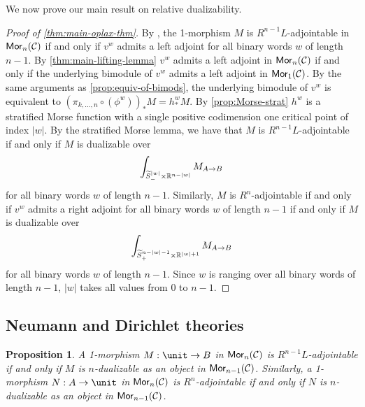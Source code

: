 \documentclass[10pt, reqno, twoside
, final
]{amsart}
\numberwithin{equation}{subsection}%
\theoremstyle{definition}
\theoremstyle{definition}
\theoremstyle{definition}
\theoremstyle{definition}
\theoremstyle{definition}
\theoremstyle{definition}
\theoremstyle{definition}
\theoremstyle{definition}
\theoremstyle{definition}
\theoremstyle{plain}
\theoremstyle{definition}
\theoremstyle{plain}
\theoremstyle{definition}
\theoremstyle{plain}
\theoremstyle{definition}
\theoremstyle{definition}
\theoremstyle{plain}
\theoremstyle{plain}
\theoremstyle{definition}
\theoremstyle{plain}
\theoremstyle{plain}
\newtheorem{prop}[defn]{Proposition}
\theoremstyle{plain}
\begin{document}
We now prove our main result on relative dualizability.

\begin{proof}[Proof of \cref{thm:main-oplax-thm}]
By \cite{JFS,SS25}, the 1-morphism $M$ is $R^{n-1}L$-adjointable in $\mathsf{Mor}_n(\mathcal{C})$ if and only if $v^w$ admits a left adjoint for all binary words $w$ of length $n-1$. By \cref{thm:main-lifting-lemma} $v^w$ admits a left adjoint in $\mathsf{Mor}_n(\mathcal{C})$ if and only if the underlying bimodule of $v^w$ admits a left adjoint in $\mathsf{Mor}_1(\mathcal{C})$. By the same arguments as \cref{prop:equiv-of-bimods}, the underlying bimodule of $v^w$ is equivalent to $(\pi_{k,...,n} \circ (\phi^w))_\ast M = h^{w}_{\ast} M$. By \cref{prop:Morse-strat} $h^w$ is a stratified Morse function with a single positive codimension one critical point of index $|w|$. By the stratified Morse lemma, we have that $M$ is $R^{n-1}L$-adjointable if and only if $M$ is dualizable over
\begin{equation*}
    \int_{\widetilde{S}^{|w|}_{-}\times \mathbb{R}^{n-|w|}} M_{A\to B}
\end{equation*}
for all binary words $w$ of length $n-1$. Similarly, $M$ is $R^{n}$-adjointable if and only if $v^w$ admits a right adjoint for all binary words $w$ of length $n-1$ if and only if $M$ is dualizable over
\begin{equation*}
    \int_{\widetilde{S}^{n-|w|-1}_+ \times \mathbb{R}^{|w|+1}} M_{A\to B}
\end{equation*}
for all binary words $w$ of length $n-1$. Since $w$ is ranging over all binary words of length $n-1$, $|w|$ takes all values from $0$ to $n-1$.
\end{proof}

\subsection{Neumann and Dirichlet theories}

\begin{prop}
A 1-morphism $M : \unit \to B$ in $\mathsf{Mor}_n(\mathcal{C})$ is $R^{n-1}L$-adjointable if and only if $M$ is $n$-dualizable as an object in $\mathsf{Mor}_{n-1}(\mathcal{C})$. Similarly, a 1-morphism $N : A \to \unit$ in $\mathsf{Mor}_n(\mathcal{C})$ is $R^{n}$-adjointable if and only if $N$ is $n$-dualizable as an object in $\mathsf{Mor}_{n-1}(\mathcal{C})$.
\end{prop}
\end{document}
